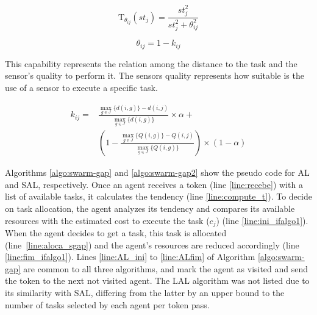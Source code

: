 \begin{equation} \label{eq:tendencia}
	\textrm{T}_{\theta_{ij}}(st_j) = \frac{st_{j}^2}{st_{j}^2 + \theta_{ij}^2}
\end{equation}

\begin{equation} \label{eq:limiar}
	\theta_{ij} = 1 - k_{ij}
\end{equation}

This capability represents the relation among the distance to the task and the sensor's quality to perform it. The sensors quality represents how suitable is the use of a sensor to execute a specific task.

\begin{equation} \label{eq:capability}
\begin{split}
k_{ij} = & \frac{\max_{g \in J} \{d(i,g)\} - d(i,j)}{\max_{g \in J} \{d(i,g)\}} \times \alpha + \\
& (1 - \frac{\max_{g \in J} \{Q(i,g)\} - Q(i,j)}{\max_{g \in J} \{Q(i,g)\}}) \times (1-\alpha)
\end{split}
\end{equation}

Algorithms \ref{algo:swarm-gap} and \ref{algo:swarm-gap2} show the pseudo code for AL and SAL, respectively. Once an agent receives a token (line \ref{line:recebe}) with a list of available tasks, it calculates the tendency (line \ref{line:compute_t}). To decide on task allocation, the agent analyzes its tendency and compares its available resources with the estimated cost to execute the task ($c_j$) (line \ref{line:ini_ifalgo1}). When the agent decides to get a task, this task is allocated (line~\ref{line:aloca_sgap}) and the agent’s resources are reduced accordingly (line \ref{line:fim_ifalgo1}). Lines \ref{line:AL_ini} to \ref{line:ALfim} of  Algorithm \ref{algo:swarm-gap} are common to all three algorithms, and mark the agent as visited and send the token to the next not visited agent. The LAL algorithm was not listed due to its similarity with SAL, differing from the latter by  an upper bound to the number of tasks selected by each agent per token pass. 

